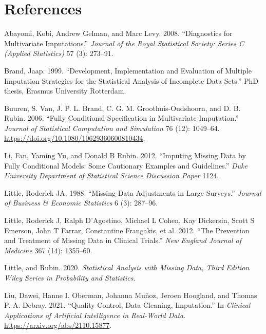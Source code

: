 \documentclass[
]{article}
\newlength{\cslhangindent}
\newlength{\cslentryspacingunit} %
\newenvironment{CSLReferences}[2] %
 {%
  \setlength{\parindent}{0pt}
  \ifodd #1
  \let\oldpar\par
  \def\par{\hangindent=\cslhangindent\oldpar}
  \fi
  \setlength{\parskip}{#2\cslentryspacingunit}
 }%
 {}
\begin{document}
\hypertarget{references}{%
\section*{References}\label{references}}

\hypertarget{refs}{}
\begin{CSLReferences}{1}{0}
\leavevmode{}%
Abayomi, Kobi, Andrew Gelman, and Marc Levy. 2008. {``Diagnostics for
Multivariate Imputations.''} \emph{Journal of the Royal Statistical
Society: Series C (Applied Statistics)} 57 (3): 273--91.

\leavevmode{}%
Brand, Jaap. 1999. {``Development, Implementation and Evaluation of
Multiple Imputation Strategies for the Statistical Analysis of
Incomplete Data Sets.''} PhD thesis, Erasmus University Rotterdam.

\leavevmode{}%
Buuren, S. Van, J. P. L. Brand, C. G. M. Groothuis-Oudshoorn, and D. B.
Rubin. 2006. {``Fully Conditional Specification in Multivariate
Imputation.''} \emph{Journal of Statistical Computation and Simulation}
76 (12): 1049--64. \url{https://doi.org/10.1080/10629360600810434}.

\leavevmode{}%
Li, Fan, Yaming Yu, and Donald B Rubin. 2012. {``Imputing Missing Data
by Fully Conditional Models: {Some} Cautionary Examples and
Guidelines.''} \emph{Duke University Department of Statistical Science
Discussion Paper} 1124.

\leavevmode{}%
Little, Roderick JA. 1988. {``Missing-Data Adjustments in Large
Surveys.''} \emph{Journal of Business \& Economic Statistics} 6 (3):
287--96.

\leavevmode{}%
Little, Roderick J, Ralph D'Agostino, Michael L Cohen, Kay Dickersin,
Scott S Emerson, John T Farrar, Constantine Frangakis, et al. 2012.
{``The Prevention and Treatment of Missing Data in Clinical Trials.''}
\emph{New England Journal of Medicine} 367 (14): 1355--60.

\leavevmode{}%
Little, and Rubin. 2020. \emph{Statistical {Analysis} with {Missing
Data}, {Third Edition} \textbar{} {Wiley Series} in {Probability} and
{Statistics}}.

\leavevmode{}%
Liu, Dawei, Hanne I. Oberman, Johanna Muñoz, Jeroen Hoogland, and Thomas
P. A. Debray. 2021. {``Quality Control, Data Cleaning, Imputation.''} In
\emph{Clinical Applications of Artificial Intelligence in Real-World
Data}. \url{https://arxiv.org/abs/2110.15877}.


\end{CSLReferences}
\end{document}
